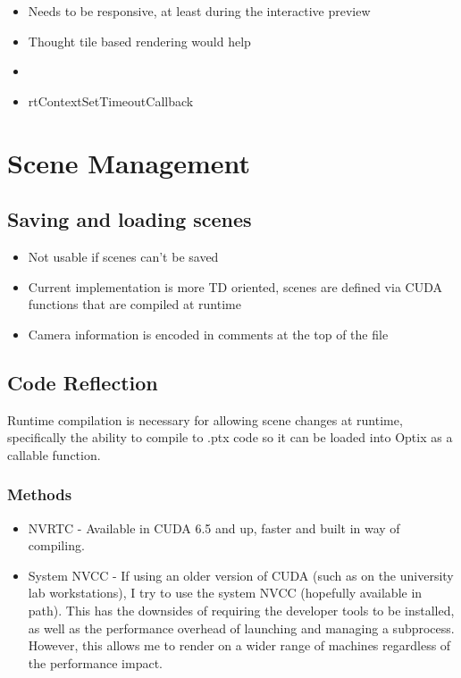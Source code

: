 \documentclass[11pt,a4paper,final,notitlepage]{report}
\begin{document}
\begin{itemize}
	\item Needs to be responsive, at least during the interactive preview
	\item Thought tile based rendering would help
	\item 
	\item rtContextSetTimeoutCallback
\end{itemize}


\section{Scene Management}

\subsection{Saving and loading scenes}
\begin{itemize}
	\item Not usable if scenes can't be saved
	\item Current implementation is more TD oriented, scenes are defined via CUDA functions that are compiled at runtime
	\item Camera information is encoded in comments at the top of the file
\end{itemize}

\subsection{Code Reflection}
Runtime compilation is necessary for allowing scene changes at runtime, specifically the ability to compile to .ptx code so it can be loaded into Optix as a callable function.
\subsubsection{Methods}

\begin{itemize}
	\item NVRTC - Available in CUDA 6.5 and up, faster and built in way of compiling.
	\item System NVCC - If using an older version of CUDA (such as on the university lab workstations), I try to use the system NVCC (hopefully available in path). This has the downsides of requiring the developer tools to be installed, as well as the performance overhead of launching and managing a subprocess. However, this allows me to render on a wider range of machines regardless of the performance impact.
\end{itemize}
\end{document}
